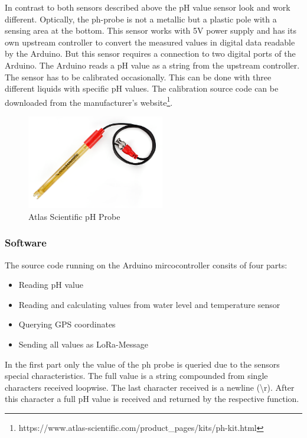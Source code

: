 \documentclass[11pt, letterpaper]{article}
\begin{document}
In contrast to both sensors described above the pH value sensor look and work different. Optically, the ph-probe is not a metallic but a plastic pole with a sensing area at the bottom. This sensor works with 5V power supply and has its own upstream controller to convert the measured values in digital data readable by the Arduino. But this sensor requires a connection to two digital ports of the Arduino. The Arduino reads a pH value as a string from the upstream controller. The sensor has to be calibrated occasionally. This can be done with three different liquids with specific pH values. The calibration source code can be downloaded from the manufacturer's website\footnote{https://www.atlas-scientific.com/product\_pages/kits/ph-kit.html}.
\begin{figure}[ht!]
	\centering
	\includegraphics[width=60mm]{figures/ph_value.png}
	\caption{Atlas Scientific pH Probe \label{ph_value}}
\end{figure}
\newline

\subsubsection{Software}
The source code running on the Arduino mircocontroller consits of four parts:
\begin{itemize}
	\item Reading pH value
	\item Reading and calculating values from water level and temperature sensor
	\item Querying GPS coordinates
	\item Sending all values as LoRa-Message
\end{itemize}
In the first part only the value of the ph probe is queried due to the sensors special characteristics. The full value is a string compounded from single characters received loopwise. The last character received is a newline (\textbackslash r). After this character a full pH value is received and returned by the respective function.
\newline
\end{document}
